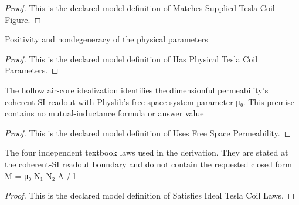 \begin{proof}
  This is the declared model definition of Matches Supplied Tesla Coil Figure.
\end{proof}
\begin{definition}
  \label{def:physics:phyx-mini-0939:phyxminiproblems-problemphyxmini0939-hasphysicalteslacoilparameters}
  Positivity and nondegeneracy of the physical parameters
\end{definition}
\begin{proof}
  This is the declared model definition of Has Physical Tesla Coil Parameters.
\end{proof}
\begin{definition}
  \label{def:physics:phyx-mini-0939:phyxminiproblems-problemphyxmini0939-usesfreespacepermeability}
  The hollow air-core idealization identifies the dimensionful permeability's coherent-SI readout with Physlib's free-space system parameter μ₀. This premise contains no mutual-inductance formula or answer value
\end{definition}
\begin{proof}
  This is the declared model definition of Uses Free Space Permeability.
\end{proof}
\begin{definition}
  \label{def:physics:phyx-mini-0939:phyxminiproblems-problemphyxmini0939-satisfiesidealteslacoillaws}
  The four independent textbook laws used in the derivation. They are stated at the coherent-SI readout boundary and do not contain the requested closed form M = μ₀ N₁ N₂ A / l
\end{definition}
\begin{proof}
  This is the declared model definition of Satisfies Ideal Tesla Coil Laws.
\end{proof}
